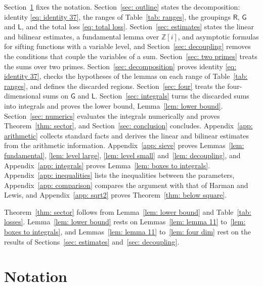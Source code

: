 \documentclass{article}
\numberwithin{equation}{section}
\begin{document}
Section~\ref{sec: notation} fixes the notation. Section~\ref{sec: outline} states the decomposition: identity \eqref{eq: identity 37}, the ranges of Table~\ref{tab: ranges}, the groupings $\mathsf{R}$, $\mathsf{G}$ and $\mathsf{L}$, and the total loss \eqref{eq: total loss}. Section~\ref{sec: estimates} states the linear and bilinear estimates, a fundamental lemma over $\mathbb{Z}[i]$, and asymptotic formulas for sifting functions with a variable level, and Section~\ref{sec: decoupling} removes the conditions that couple the variables of a sum. Section~\ref{sec: two primes} treats the sums over two primes. Section~\ref{sec: decomposition} proves identity \eqref{eq: identity 37}, checks the hypotheses of the lemmas on each range of Table~\ref{tab: ranges}, and defines the discarded regions. Section~\ref{sec: four} treats the four-dimensional sums on $\mathsf{G}$ and $\mathsf{L}$. Section~\ref{sec: integrals} turns the discarded sums into integrals and proves the lower bound, Lemma~\ref{lem: lower bound}. Section~\ref{sec: numerics} evaluates the integrals numerically and proves Theorem~\ref{thm: sector}, and Section~\ref{sec: conclusion} concludes. Appendix~\ref{app: arithmetic} collects standard facts and derives the linear and bilinear estimates from the arithmetic information. Appendix~\ref{app: sieve} proves Lemmas~\ref{lem: fundamental}, \ref{lem: level large}, \ref{lem: level small} and~\ref{lem: decoupling}, and Appendix~\ref{app: integrals} proves Lemma~\ref{lem: boxes to integrals}. Appendix~\ref{app: inequalities} lists the inequalities between the parameters, Appendix~\ref{app: comparison} compares the argument with that of Harman and Lewis, and Appendix~\ref{app: sqrt2} proves Theorem~\ref{thm: below square}.

Theorem~\ref{thm: sector} follows from Lemma~\ref{lem: lower bound} and Table~\ref{tab: losses}. Lemma~\ref{lem: lower bound} rests on Lemmas~\ref{lem: lemma 11} to~\ref{lem: boxes to integrals}, and Lemmas~\ref{lem: lemma 11} to~\ref{lem: four dim} rest on the results of Sections~\ref{sec: estimates} and~\ref{sec: decoupling}.

\section{Notation}
\label{sec: notation}
\end{document}
